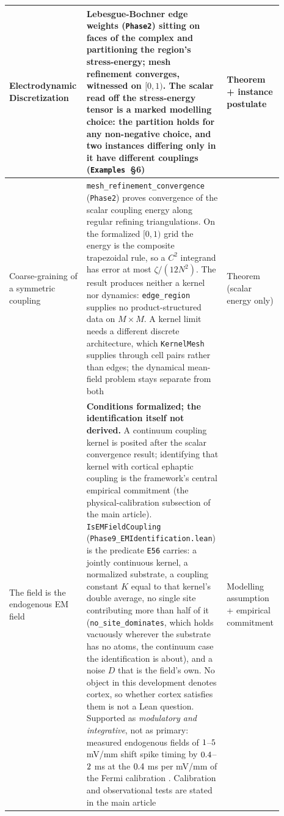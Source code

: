 \documentclass{article}
\renewcommand{\cite}[1]{\citep{#1}}
\begin{document}
\begin{longtable}{|>{\raggedright\arraybackslash}p{0.26\linewidth}|>{\raggedright\arraybackslash}p{0.46\linewidth}|>{\raggedright\arraybackslash}p{0.17\linewidth}|}
Electrodynamic Discretization & Lebesgue-Bochner edge weights (\texttt{Phase2}) sitting on faces of the complex and partitioning the region's stress-energy; mesh refinement converges, witnessed on $[0,1)$. The scalar read off the stress-energy tensor is a marked modelling choice: the partition holds for any non-negative choice, and two instances differing only in it have different couplings (\texttt{Examples}~\S6) & Theorem + instance postulate \\ \hline
Coarse-graining of a symmetric coupling & \nolinkurl{mesh_refinement_convergence} (\texttt{Phase2}) proves convergence of the scalar coupling energy along regular refining triangulations. On the formalized $[0,1)$ grid the energy is the composite trapezoidal rule, so a $C^2$ integrand has error at most $\zeta/(12N^2)$. The result produces neither a kernel nor dynamics: \nolinkurl{edge_region} supplies no product-structured data on $M\times M$. A kernel limit needs a different discrete architecture, which \texttt{KernelMesh} supplies through cell pairs rather than edges; the dynamical mean-field problem stays separate from both & Theorem (scalar energy only) \\ \hline
The field is the endogenous EM field & \textbf{Conditions formalized; the identification itself not derived.} A continuum coupling kernel is posited after the scalar convergence result; identifying that kernel with cortical ephaptic coupling is the framework's central empirical commitment (the physical-calibration subsection of the main article). \texttt{IsEMFieldCoupling} (\nolinkurl{Phase9_EMIdentification.lean}) is the predicate \texttt{E56} carries: a jointly continuous kernel, a normalized substrate, a coupling constant $K$ equal to that kernel's double average, no single site contributing more than half of it (\nolinkurl{no_site_dominates}, which holds vacuously wherever the substrate has no atoms, the continuum case the identification is about), and a noise $D$ that is the field's own. No object in this development denotes cortex, so whether cortex satisfies them is not a Lean question. Supported as \emph{modulatory and integrative}, not as primary: measured endogenous fields of $1$--$5$ mV/mm shift spike timing by $\fpeval{round(\fermiFieldMin*\fermiShift,1)}$--$\fpeval{round(\fermiFieldMax*\fermiShift,1)}$ ms at the $0.4$ ms per mV/mm of the Fermi calibration \cite{frohlich2010, anastassiou2015}. Calibration and observational tests are stated in the main article & Modelling assumption + empirical commitment \\ \hline

\end{longtable}
\end{document}

